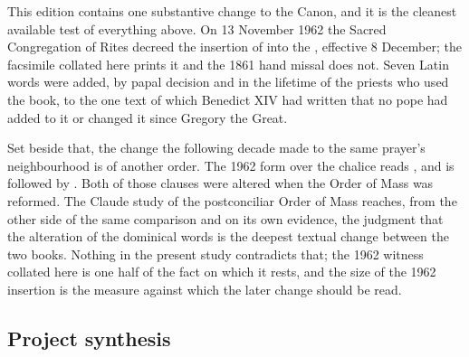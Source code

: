 This edition contains one substantive change to the Canon, and it is the
cleanest available test of everything above. On 13 November 1962 the Sacred
Congregation of Rites decreed the insertion of  into the , effective 8
December; the facsimile collated here prints it and the 1861 hand missal does
not. Seven Latin words were added, by papal decision and in the lifetime of the priests who
used the book, to the one text of which Benedict XIV had written that no pope
had added to it or changed it since Gregory the Great.

Set beside that, the change the following decade made to the same prayer's
neighbourhood is of another order. The 1962 form over the chalice reads
, and is followed by . Both of those clauses were altered when the Order of Mass
was reformed. The Claude study of the postconciliar Order of Mass reaches, from
the other side of the same comparison and on its own evidence, the judgment
that the alteration of the dominical words is the deepest textual change
between the two books. Nothing in the present study contradicts that; the 1962
witness collated here is one half of the fact on which it rests, and the size
of the 1962 insertion is the measure against which the later change should be
read.

\subsection*{Project synthesis}

